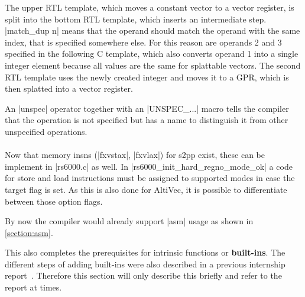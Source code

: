 The upper \ac{RTL} template, which moves a constant vector to a vector register, is split into the bottom \ac{RTL} template, which inserts an intermediate step.
|match_dup n| means that the operand should match the operand with the same index, that is specified somewhere else.
For this reason are operands 2 and 3 specified in the following C template, which also converts operand 1 into a single integer element because all values are the same for splattable vectors.
The second \ac{RTL} template uses the newly created integer and moves it to a \ac{GPR}, which is then splatted into a vector register.

An |unspec| operator together with an |UNSPEC_...| macro tells the compiler that the operation is not specified but has a name to distinguish it from other unspecified operations.
\\
\\
Now that memory insns (|fxvstax|, |fxvlax|) for \ac{s2pp} exist, these can be implement in |rs6000.c| as well.
In |rs6000_init_hard_regno_mode_ok| a code for store and load instructions must be assigned to supported modes in case the target flag is set.
As this is also done for AltiVec, it is possible to differentiate between those option flags.

By now the compiler would already support |asm| usage as shown in \ref{section:asm}.

This also completes the prerequisites for intrinsic functions or \textbf{built-ins}.
The different steps of adding built-ins were also described in a previous internship report~\citep{heimbrecht_2017internship}.
Therefore this section will only describe this briefly and refer to the report at times.

